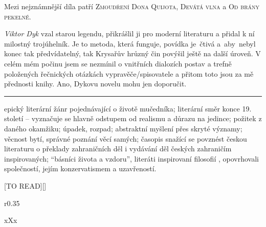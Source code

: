 \documentclass{extarticle} %
\begin{document}
\noindent 
Mezi nejznámnější díla patří \textsc{Zmoudření Dona Quijota}, \textsc{Devátá vlna} a \textsc{Od brány pekelné}.






\noindent 
\textit{Viktor Dyk} vzal starou legendu, přikrášlil ji pro moderní literaturu a přidal k ní milostný trojúhelník.
Je to metoda, která funguje, povídka je~čtivá a~aby~nebyl konec tak předvídatelný, tak Krysařův hrůzný čin povýšil ještě na další úroveň.
V celém mém počinu jsem se nezmínil o vnitřních dialozích postav a trefně položených řečnických otázkách vypravěče/spisovatele a přitom toto jsou za mě přednosti knihy.
Ano, Dykovu novelu mohu jen doporučit.

\vfill

\noindent\begin{minipage}{\textwidth}
    {\textcolor{\wpagecolor}{\rule{\linewidth}{0.4pt}}
    \footnotesize
     epický literární žánr pojednávající o životě mučedníka;
     literární směr konce 19. století -- vyznačuje se hlavně odstupem od realismu a důrazu na jedince;
     požitek z daného okamžiku;
     úpadek, rozpad;
     abstraktní myšlení přes skryté významy;
     věcnost bytí, správné poznání věcí samých;
     časopis snažící se povznést českou literaturu o překlady zahraničních děl i vydávání děl českých zahraničím inspirovaných;
     \enquote{básníci života a vzdoru}, literáti inspirovaní filosofií , opovrhovali společností, jejím konzervatismem a uzavřeností.
    }
\end{minipage}

\newpage


\changefontsize{8pt}

[TO READ][\killpage]

\noindent\begin{wrapfigure}{r}{0.35\textwidth}
\tiny

\setlength{\parindent}{3pt}
xXx
\end{wrapfigure}
\end{document}
